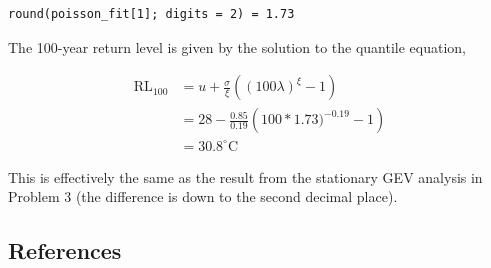 \documentclass[
  letterpaper,
  DIV=11,
  numbers=noendperiod]{scrartcl}
\begin{document}
\begin{verbatim}
round(poisson_fit[1]; digits = 2) = 1.73
\end{verbatim}

The 100-year return level is given by the solution to the quantile
equation,

\[
\begin{aligned}
\text{RL}_{100} &= u + \frac{\sigma}{\xi}\left((100\lambda)^\xi - 1\right)
\\ &= 28 - \frac{0.85}{0.19}\left(100 * 1.73)^{-0.19} - 1\right) \\
&= 30.8^\circ \text{C}
\end{aligned}
\]

This is effectively the same as the result from the stationary GEV
analysis in Problem 3 (the difference is down to the second decimal
place).

\subsection{References}\label{references}
\end{document}
